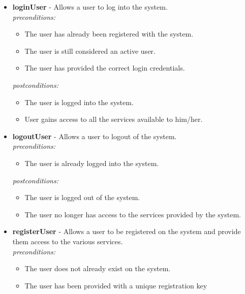 \documentclass[a4paper,12pt]{article}
\begin{document}
	\begin{itemize}
		\item \textbf{loginUser} - Allows a user to log into the system.\\[0.5cm]
		\textit{preconditions:}
			\begin{itemize}
				\item The user has already been registered with the system.
				\item The user is still considered an active user.
				\item The user has provided the correct login credentials.
			\end{itemize}
			
		\textit{postconditions:}
			\begin{itemize}
				\item The user is logged into the system.
				\item User gains access to all the services available to him/her.\\[0.5cm]
			\end{itemize}
			
		\item \textbf{logoutUser} - Allows a user to logout of the system.\\[0.5cm]
		\textit{preconditions:}
			\begin{itemize}
				\item The user is already logged into the system.
			\end{itemize}
		
		\textit{postconditions:}
			\begin{itemize}
				\item The user is logged out of the system.
				\item The user no longer has access to the services provided by the system.\\[0.5cm]
			\end{itemize}
			
		\item \textbf{registerUser} - Allows a user to be registered on the system and provide them access to the various services.\\[0.5cm]
		\textit{preconditions:}
			\begin{itemize}
				\item The user does not already exist on the system.
				\item The user has been provided with a unique registration key
			\end{itemize}
		

\end{itemize}
\end{document}
